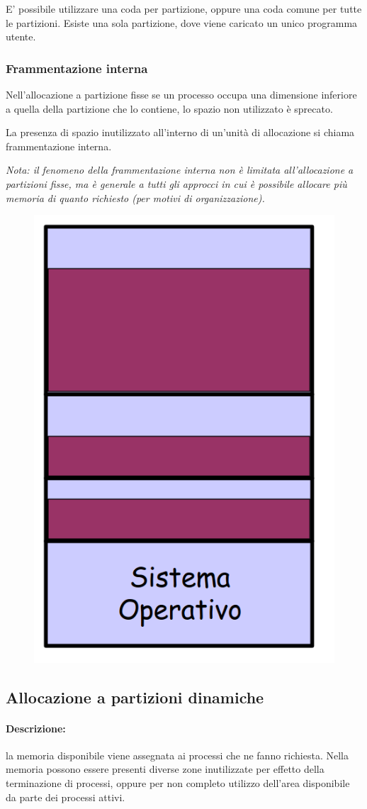 E' possibile utilizzare una coda per partizione, oppure una coda
comune per tutte le partizioni. Esiste una sola partizione,
dove viene caricato un unico programma utente.

\subsubsection{Frammentazione interna}
Nell'allocazione a partizione fisse se un processo occupa una dimensione inferiore a quella della partizione che lo
contiene, lo spazio non utilizzato è sprecato.

La presenza di spazio inutilizzato all'interno di un'unità di allocazione si chiama frammentazione interna.

\textit{Nota: il fenomeno della frammentazione interna
non è limitata all'allocazione a partizioni fisse, ma è generale
a tutti gli approcci in cui è possibile allocare più memoria di
quanto richiesto (per motivi di organizzazione).}

\begin{figure} [h]
    \centering
    \includegraphics[width=0.22\linewidth]{Images/Screenshot 2025-01-16 at 19-06-25 so-05-memoria - so-05-memoria.pdf.png}
\end{figure}
\newpage
\subsection{Allocazione a partizioni dinamiche}

\paragraph{Descrizione:} la memoria disponibile viene assegnata ai processi che ne fanno richiesta.
Nella memoria possono essere presenti diverse zone inutilizzate per effetto della terminazione di processi, oppure per non completo utilizzo dell'area disponibile da parte dei processi
attivi.

